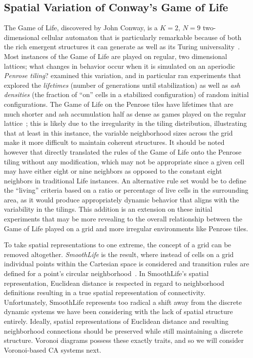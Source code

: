 \documentclass[a4paper,11pt]{report}
\begin{document}
\subsection{Spatial Variation of Conway's Game of Life}
\label{subsec:gol}
The Game of Life, discovered by John Conway, is a $K=2$, $N=9$ two-dimensional cellular automaton that is particularly remarkable because of both the rich emergent structures it can generate as well as its Turing universality~\cite{ga70}. Most instances of the Game of Life are played on regular, two dimensional lattices; what changes in behavior occur when it is simulated on an aperiodic \textit{Penrose tiling}? \citeauthor{hi05} examined this variation, and in particular ran experiments that explored the \textit{lifetimes} (number of generations until stabilization) as well as  \textit{ash densities} (the fraction of ``on'' cells in a stabilized configuration) of random initial configurations. The Game of Life on the Penrose tiles have lifetimes that are much shorter and ash accumulation half as dense as games played on the regular lattice~\cite{hi05}; this is likely due to the irregularity in the tiling distribution, illustrating that at least in this instance, the variable neighborhood sizes across the grid make it more difficult to maintain coherent structures. It should be noted however that \citeauthor{hi05} directly translated the rules of the Game of Life onto the Penrose tiling without any modification, which may not be appropriate since a given cell may have either eight or nine neighbors as opposed to the constant eight neighbors in traditional Life instances. An alternative rule set would be to define the ``living'' criteria based on a ratio or percentage of live cells in the surrounding area, as it would produce appropriately dynamic behavior that aligns with the variability in the tilings. This addition is an extension on these initial experiments that may be more revealing to the overall relationship between the Game of Life played on a grid and more irregular environments like Penrose tiles. 

To take spatial representations to one extreme, the concept of a grid can be removed altogether. \textit{SmoothLife} is the result, where instead of cells on a grid individual points within the Cartesian space is considered and transition rules are defined for a point's circular neighborhood~\cite{ra11}. In SmoothLife's spatial representation, Euclidean distance is respected in regard to neighborhood definitions resulting in a true spatial representation of connectivity. Unfortunately, SmoothLife represents too radical a shift away from the discrete dynamic systems we have been considering with the lack of spatial structure entirely. Ideally, spatial representations of Euclidean distance and resulting neighborhood connections should be preserved while still maintaining a discrete structure. Voronoi diagrams possess these exactly traits, and so we will consider Voronoi-based CA systems next.
\end{document}
